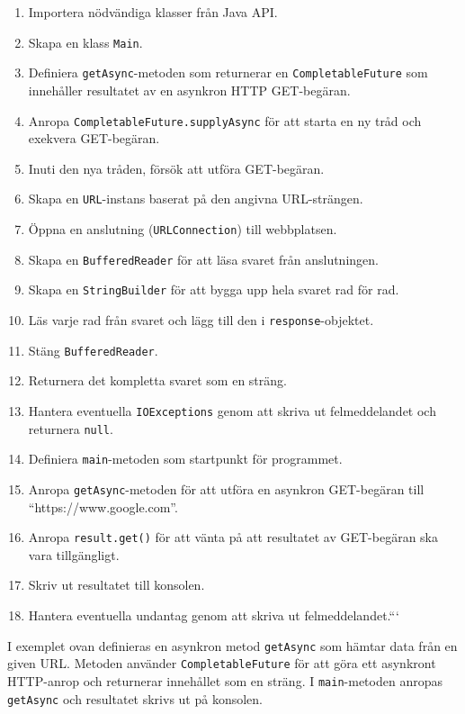 \begin{enumerate}
\def\labelenumi{\arabic{enumi}.}
\tightlist
\item
  Importera nödvändiga klasser från Java API.
\item
  Skapa en klass \texttt{Main}.
\item
  Definiera \texttt{getAsync}-metoden som returnerar en
  \texttt{CompletableFuture} som innehåller resultatet av en asynkron
  HTTP GET-begäran.
\item
  Anropa \texttt{CompletableFuture.supplyAsync} för att starta en ny
  tråd och exekvera GET-begäran.
\item
  Inuti den nya tråden, försök att utföra GET-begäran.
\item
  Skapa en \texttt{URL}-instans baserat på den angivna URL-strängen.
\item
  Öppna en anslutning (\texttt{URLConnection}) till webbplatsen.
\item
  Skapa en \texttt{BufferedReader} för att läsa svaret från
  anslutningen.
\item
  Skapa en \texttt{StringBuilder} för att bygga upp hela svaret rad för
  rad.
\item
  Läs varje rad från svaret och lägg till den i
  \texttt{response}-objektet.
\item
  Stäng \texttt{BufferedReader}.
\item
  Returnera det kompletta svaret som en sträng.
\item
  Hantera eventuella \texttt{IOExceptions} genom att skriva ut
  felmeddelandet och returnera \texttt{null}.
\item
  Definiera \texttt{main}-metoden som startpunkt för programmet.
\item
  Anropa \texttt{getAsync}-metoden för att utföra en asynkron
  GET-begäran till ``https://www.google.com''.
\item
  Anropa \texttt{result.get()} för att vänta på att resultatet av
  GET-begäran ska vara tillgängligt.
\item
  Skriv ut resultatet till konsolen.
\item
  Hantera eventuella undantag genom att skriva ut felmeddelandet.```
\end{enumerate}

I exemplet ovan definieras en asynkron metod \texttt{getAsync} som
hämtar data från en given URL. Metoden använder
\texttt{CompletableFuture} för att göra ett asynkront HTTP-anrop och
returnerar innehållet som en sträng. I \texttt{main}-metoden anropas
\texttt{getAsync} och resultatet skrivs ut på konsolen.

